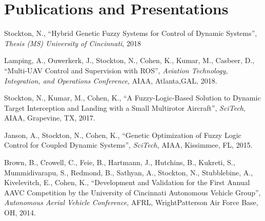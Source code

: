 \documentclass[letterpaper]{deedy-resume}
\begin{document}
\begin{minipage}[t]{\textwidth}
    \section{Publications and Presentations}
    \begin{compactitem}
    \item Stockton, N., ``Hybrid Genetic Fuzzy Systems for Control of Dynamic Systems'', \emph{Thesis (MS) University
            of Cincinnati}, 2018
        \item Lamping, A., Ouwerkerk, J., Stockton, N., Cohen, K., Kumar, M., Casbeer, D., ``Multi-UAV Control
            and Supervision with ROS'', \emph{Aviation Technology, Integration, and Operations Conference},
            AIAA, Atlanta,GAL, 2018.
        \item Stockton, N., Kumar, M., Cohen, K., ``A Fuzzy-Logic-Based Solution to Dynamic Target
            Interception and Landing with a Small Multirotor Aircraft'', \emph{SciTech}, AIAA, Grapevine, TX,
            2017.
        \item Janson, A., Stockton, N., Cohen, K., ``Genetic Optimization of Fuzzy Logic Control for Coupled Dynamic Systems'', \emph{SciTech}, AIAA, Kissimmee, FL, 2015.
        \item Brown, B., Crowell, C., Feie, B., Hartmann, J., Hutchins, B., Kukreti, S., Mummidivarapu, S., Redmond, B., Sathyan, A., Stockton, N., Stubblebine, A., Kivelevitch, E., Cohen, K., ``Development and Validation for the First Annual AAVC Competition by the University of Cincinnati Autonomous Vehicle Group'', \emph{Autonomous Aerial Vehicle Conference}, AFRL, Wright\textendash Patterson Air Force Base, OH, 2014.
    \end{compactitem}
    

\end{minipage} %




\end{document}
